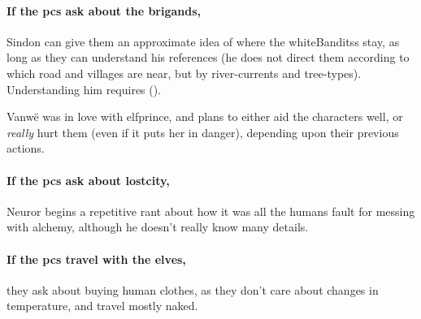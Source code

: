 
\paragraph{If the \glspl{pc} ask about the brigands,}
Sindon can give them an approximate idea of where the \glspl{whiteBandits} stay, as long as they can understand his references (he does not direct them according to which road and \glspl{village} are near, but by river-currents and tree-types).
Understanding him requires  (\tn[10]).



Vanw\"e was in love with \gls{elfprince}, and plans to either aid the characters well, or \emph{really} hurt them (even if it puts her in danger), depending upon their previous actions.

\label{neuror}


\paragraph{If the \glspl{pc} ask about \gls{lostcity},}
Neuror begins a repetitive rant about how it was all the humans fault for messing with alchemy, although he doesn't really know many details.

\paragraph{If the \glspl{pc} travel with the elves,}
they ask about buying human clothes, as they don't care about changes in temperature, and travel mostly naked.%
